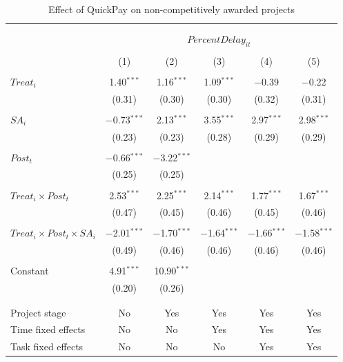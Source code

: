 \documentclass[
]{article}
\begin{document}
\begin{table}[H] \centering 
  \caption{Effect of QuickPay on non-competitively awarded projects} 
  \label{} 
\small 
\begin{tabular}{@{\extracolsep{-2pt}}lccccc} 
\\[-1.8ex]\hline 
\hline \\[-1.8ex] 
\\[-1.8ex] & \multicolumn{5}{c}{$PercentDelay_{it}$  } \\ 
\\[-1.8ex] & (1) & (2) & (3) & (4) & (5)\\ 
\hline \\[-1.8ex] 
 $Treat_i$ & 1.40$^{***}$ & 1.16$^{***}$ & 1.09$^{***}$ & $-$0.39 & $-$0.22 \\ 
  & (0.31) & (0.30) & (0.30) & (0.32) & (0.31) \\ 
  & & & & & \\ 
 $SA_i$ & $-$0.73$^{***}$ & 2.13$^{***}$ & 3.55$^{***}$ & 2.97$^{***}$ & 2.98$^{***}$ \\ 
  & (0.23) & (0.23) & (0.28) & (0.29) & (0.29) \\ 
  & & & & & \\ 
 $Post_t$ & $-$0.66$^{***}$ & $-$3.22$^{***}$ &  &  &  \\ 
  & (0.25) & (0.25) &  &  &  \\ 
  & & & & & \\ 
 $Treat_i \times Post_t$ & 2.53$^{***}$ & 2.25$^{***}$ & 2.14$^{***}$ & 1.77$^{***}$ & 1.67$^{***}$ \\ 
  & (0.47) & (0.45) & (0.46) & (0.45) & (0.46) \\ 
  & & & & & \\ 
 $Treat_i \times Post_t \times SA_i $ & $-$2.01$^{***}$ & $-$1.70$^{***}$ & $-$1.64$^{***}$ & $-$1.66$^{***}$ & $-$1.58$^{***}$ \\ 
  & (0.49) & (0.46) & (0.46) & (0.46) & (0.46) \\ 
  & & & & & \\ 
 Constant & 4.91$^{***}$ & 10.90$^{***}$ &  &  &  \\ 
  & (0.20) & (0.26) &  &  &  \\ 
  & & & & & \\ 
\hline \\[-1.8ex] 
Project stage & No & Yes & Yes & Yes & Yes \\ 
Time fixed effects & No & No & Yes & Yes & Yes \\ 
Task fixed effects & No & No & No & Yes & Yes \\ 

\end{tabular}
\end{table}
\end{document}
